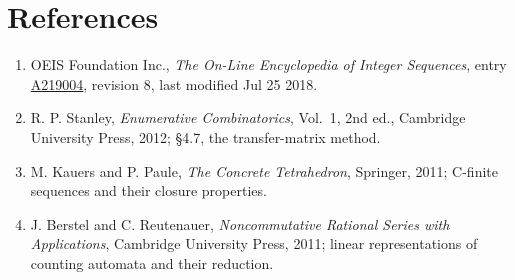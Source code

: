 \documentclass[11pt]{article}
\theoremstyle{definition}
\begin{document}
\section{References}

\begin{enumerate}

\item OEIS Foundation Inc., \emph{The On-Line Encyclopedia of Integer Sequences}, entry \href{https://oeis.org/A219004}{A219004}, revision 8, last modified Jul 25 2018.

\item R. P. Stanley, \emph{Enumerative Combinatorics}, Vol.~1, 2nd ed., Cambridge University Press, 2012; \S4.7, the transfer-matrix method.

\item M. Kauers and P. Paule, \emph{The Concrete Tetrahedron}, Springer, 2011; C-finite sequences and their closure properties.

\item J. Berstel and C. Reutenauer, \emph{Noncommutative Rational Series with Applications}, Cambridge University Press, 2011; linear representations of counting automata and their reduction.

\end{enumerate}
\end{document}
